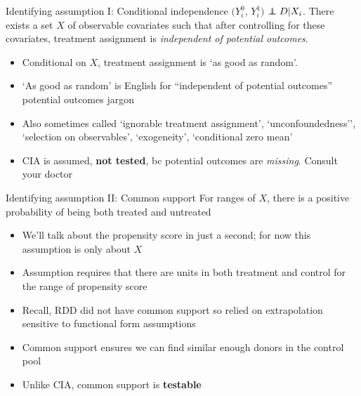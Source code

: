 \documentclass[notes=show]{beamer}
\newcommand\independent{\protect\mathpalette{\protect\independenT}{\perp}}
\def\independenT#1#2{\mathrel{\rlap{$#1#2$}\mkern2mu{#1#2}}}
\begin{document}
\begin{frame}[plain]

	\begin{block}{Identifying assumption I: Conditional independence}
	$(Y_i^0$, $Y_i^1)$ $\independent{D} | X_i$. There exists a set $X$ of observable covariates such that after controlling for these covariates, treatment assignment is \emph{independent of potential outcomes}.
	\end{block}
	
	\begin{itemize}
	\item Conditional on $X$, treatment assignment is `as good as random'. 
	\item `As good as random' is English for ``independent of potential outcomes'' potential outcomes jargon
	\item Also sometimes called `ignorable treatment assignment', `unconfoundedness'', `selection on observables', `exogeneity', `conditional zero mean'
	\item CIA is assumed, \textbf{not tested}, bc potential outcomes are \emph{missing}. Consult your doctor
	\end{itemize}
\end{frame}

\begin{frame}[plain]

	\begin{block}{Identifying assumption II: Common support}
	For ranges of $X$, there is a positive probability of being both treated and untreated
	\end{block}
	
	\begin{itemize}
	\item We'll talk about the propensity score in just a second; for now this assumption is only about $X$
	\item Assumption requires that there are units in both treatment and control for the range of propensity score
	\item Recall, RDD did not have common support so relied on extrapolation sensitive to functional form assumptions
	\item Common support ensures we can find similar enough donors in the control pool
	\item Unlike CIA, common support is \textbf{testable}
	\end{itemize}
\end{frame}
\end{document}
